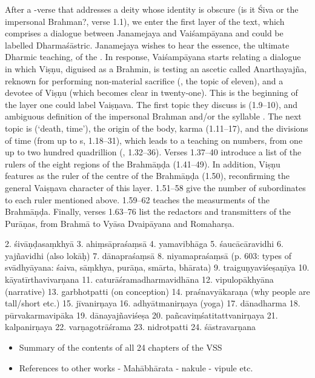 \documentclass[11pt]{book}
\begin{document}
After a -verse that addresses a deity whose identity 
is obscure (is it Śiva or the impersonal Brahman?, verse 1.1), we enter the first layer 
of the text, which comprises a dialogue between Janamejaya and Vaiśampāyana and
could be labelled Dharmaśāstric.
Janamejaya wishes to hear the essence, the ultimate Dharmic teaching, 
of the \MBh. In response, Vaiśampāyana starts relating a dialogue in 
which Viṣṇu, diguised as a Brahmin, is testing an ascetic called 
Anarthayajña, reknown for performing non-material sacrifice
(, the topic of  eleven), and 
a devotee of Viṣṇu (which becomes clear in  twenty-one).
This is the beginning of the layer one could label Vaiṣṇava.
The first topic they discuss is  (1.9--10), and ambiguous 
definition of the impersonal Brahman and/or the syllable .
The next topic is  (`death, time'), the origin of the body, karma (1.11--17),
and the divisions of time (from  up to s, 1.18--31),
which leads to a teaching on numbers, from one up to two hundred quadrillion (, 1.32--36).
Verses 1.37--40 introduce a list of the rulers of the eight regions of the Brahmāṇḍa (1.41--49).
In addition, Viṣṇu features as the ruler of the centre of the Brahmāṇḍa (1.50), 
reconfirming the general Vaiṣṇava character of this layer. 
1.51--58 give the number of subordinates to each ruler mentioned above. 1.59--62 teaches
the measurments of the Brahmāṇḍa. Finally, verses 1.63--76 list the redactors and
transmitters of the Purāṇas, from Brahmā to Vyāsa Dvaipāyana and Romaharṣa.
 
 
  2. śivāṇḍasaṃkhyā 
  3. ahiṃsāpraśaṃsā 
  4. yamavibhāga
  5. śaucācāravidhi
  6. yajñavidhi (also lokāḥ)
  7. dānapraśaṃsā 
  8. niyamapraśaṃsā (p. 603: types of svādhyāyana: śaiva, sāṃkhya, purāṇa,
                    smārta, bhārata)
  9. traiguṇyaviśeṣaṇīya
  10. kāyatīrthavivarṇana
  11. caturāśramadharmavidhāna 
  12. vipulopākhyāna  (narrative)
  13. garbhotpatti (on conception)
  14. praśnavyākaraṇa (why people are tall/short etc.)
  15. jīvanirṇaya 
  16. adhyātmanirṇaya (yoga) 
  17. dānadharma
  18. pūrvakarmavipāka
  19. dānayajñaviśeṣa
  20. pañcaviṃśatitattvanirṇaya
  21. kalpanirṇaya
  22. varṇagotrāśrama
  23. nidrotpatti
  24. śāstravarṇana

\begin{itemize}

\item
  Summary of the contents of all 24 chapters of the VSS
\item
  References to other works - Mahābhārata - nakule - vipule etc.
\end{itemize}
\end{document}
